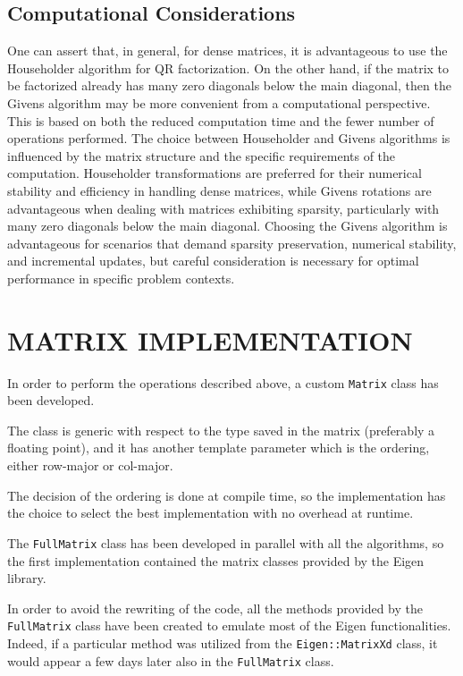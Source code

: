 \documentclass{article}
\begin{document}
\subsection{Computational Considerations}
One can assert that, in general, for dense matrices, it is advantageous to use the Householder algorithm for QR factorization. On the other hand, if the matrix to be factorized already has many zero diagonals below the main diagonal, then the Givens algorithm may be more convenient from a computational perspective. This is based on both the reduced computation time and the fewer number of operations performed. The choice between Householder and Givens algorithms is influenced by the matrix structure and the specific requirements of the computation. Householder transformations are preferred for their numerical stability and efficiency in handling dense matrices, while Givens rotations are advantageous when dealing with matrices exhibiting sparsity, particularly with many zero diagonals below the main diagonal. Choosing the Givens algorithm is advantageous for scenarios that demand sparsity preservation, numerical stability, and incremental updates, but careful consideration is necessary for optimal performance in specific problem contexts.


\section{MATRIX IMPLEMENTATION}

In order to perform the operations described above, a custom \texttt{Matrix} class has been developed.

The class is generic with respect to the type saved in the matrix (preferably a floating point), and it has another template parameter which is the ordering, either row-major or col-major.

The decision of the ordering is done at compile time, so the implementation has the choice to select the best implementation with no overhead at runtime.

The \texttt{FullMatrix} class has been developed in parallel with all the algorithms, so the first implementation contained the matrix classes provided by the Eigen library.

In order to avoid the rewriting of the code, all the methods provided by the \texttt{FullMatrix} class have been created to emulate most of the Eigen functionalities. Indeed, if a particular method was utilized from the \texttt{Eigen::MatrixXd} class, it would appear a few days later also in the \texttt{FullMatrix} class.
\end{document}
